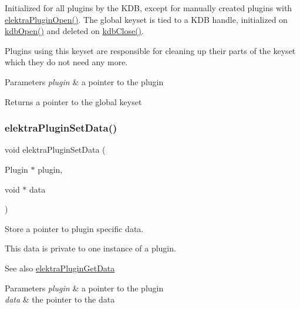 Initialized for all plugins by the K\+DB, except for manually created plugins with {\ttfamily \hyperlink{elektra_2plugin_8c_a32a70a7876542c51d153164ac5108a57}{elektra\+Plugin\+Open()}}. The global keyset is tied to a K\+DB handle, initialized on {\ttfamily \hyperlink{group__kdb_ga844e1299a84c3fbf1d3a905c5c893ba5}{kdb\+Open()}} and deleted on {\ttfamily \hyperlink{group__kdb_gadb54dc9fda17ee07deb9444df745c96f}{kdb\+Close()}}.

Plugins using this keyset are responsible for cleaning up their parts of the keyset which they do not need any more.


\begin{DoxyParams}{Parameters}
{\em plugin} & a pointer to the plugin \\
\hline
\end{DoxyParams}
\begin{DoxyReturn}{Returns}
a pointer to the global keyset 
\end{DoxyReturn}
\mbox{\label{group__plugin_gaf4b941a52ff55d0ca2a9158d90208ef2}} 
\subsubsection{\texorpdfstring{elektra\+Plugin\+Set\+Data()}{elektraPluginSetData()}}
{\footnotesize\ttfamily void elektra\+Plugin\+Set\+Data (\begin{DoxyParamCaption}\item[{Plugin $\ast$}]{plugin,  }\item[{void $\ast$}]{data }\end{DoxyParamCaption})}



Store a pointer to plugin specific data. 

This data is private to one instance of a plugin.

\begin{DoxySeeAlso}{See also}
\hyperlink{group__plugin_gaafcf3216b46292f222b8cc7828b4dd20}{elektra\+Plugin\+Get\+Data} 
\end{DoxySeeAlso}

\begin{DoxyParams}{Parameters}
{\em plugin} & a pointer to the plugin \\
\hline
{\em data} & the pointer to the data \\
\hline
\end{DoxyParams}
